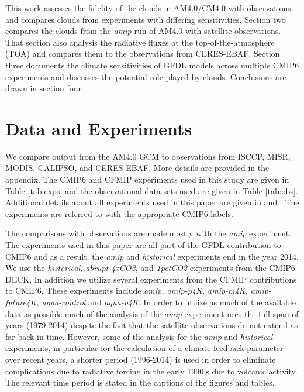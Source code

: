 \documentclass[draft]{agujournal2019}
\begin{document}
This work assesses the fidelity of the clouds in AM4.0/CM4.0 with observations and compares clouds from experiments 
with differing sensitivities. 
Section two compares the clouds from the \textit{amip} run of AM4.0 with satellite observations.  That section also 
analysis the radiative fluxes at the top-of-the-atmosphere (TOA) and compares them to the observations from 
CERES-EBAF.    Section three documents the climate sensitivities of GFDL models across multiple CMIP6 experiments 
and discusses the potential role played by clouds.   Conclusions are drawn in section four.  

\section{Data and Experiments}

We compare output from the AM4.0 GCM to observations from ISCCP, MISR, MODIS, CALIPSO, and CERES-EBAF.
More details are provided in the appendix.  The CMIP6 and CFMIP experiments used in this study are given in Table
\ref{tab:exps} and the observational data sets used are given in Table \ref{tab:obs}.  Additional details about all 
experiments used in this paper are given in \cite{Eyring_etal_2016} and \cite{Webb_etal_2017}.  The experiments are referred to with the
appropriate CMIP6 labels.   

The comparisons with observations are made mostly with the \textit{amip} experiment.   The experiments used 
in this paper are all part of the GFDL contribution to CMIP6 and as a result, the \textit{amip} and \textit{historical}
experiments end in the year 2014.  We use the \textit{historical, abrupt-4xCO2}, and \textit{1pctCO2}
experiments from the CMIP6 DECK.  In addition we utilize several experiments from the CFMIP contributions 
to CMIP6.  These experiments include \textit{amip, amip-p4K, amip-m4K, amip-future4K, aqua-control} and \textit{aqua-p4K}.  
In order to utilize as much of the available data as possible much of the analysis of the \textit{amip} experiment uses the 
full span of years (1979-2014) despite the fact that the satellite observations do not extend as far back in time.  However, 
some of the analysis for the \textit{amip} and \textit{historical} experiments, in particular for the calculation of a climate feedback parameter over recent years, a shorter period (1996-2014) is used in order to eliminate complications due to radiative forcing in the early 1990's due to volcanic activity.  The relevant time period is stated in the captions of the figures and tables.   
\end{document}
